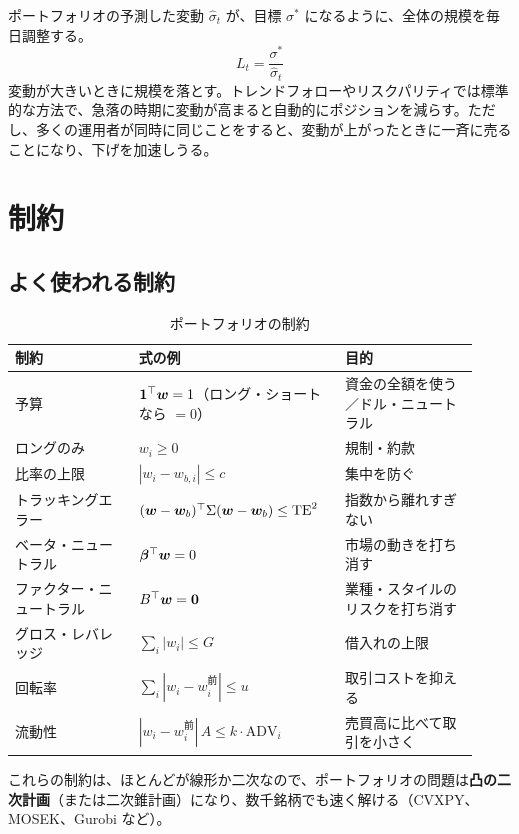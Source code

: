 ポートフォリオの予測した変動 $\hat\sigma_t$ が、目標 $\sigma^*$ になるように、全体の規模を毎日調整する。
\begin{equation}
L_t = \frac{\sigma^*}{\hat\sigma_t}
\end{equation}
変動が大きいときに規模を落とす。トレンドフォローやリスクパリティでは標準的な方法で、急落の時期に変動が高まると自動的にポジションを減らす。ただし、多くの運用者が同時に同じことをすると、変動が上がったときに一斉に売ることになり、下げを加速しうる。

\section{制約}

\subsection{よく使われる制約}

\begin{table}[H]
\centering\small
\caption{ポートフォリオの制約}
\label{tab:constraints}
\begin{tabular}{@{}P{0.25\linewidth}P{0.4\linewidth}P{0.27\linewidth}@{}}
\toprule
制約 & 式の例 & 目的 \\
\midrule
予算 & $\bm 1^{\top}\bm w = 1$（ロング・ショートなら $= 0$） & 資金の全額を使う／ドル・ニュートラル \\
ロングのみ & $w_i \geq 0$ & 規制・約款 \\
比率の上限 & $|w_i - w_{b,i}| \leq c$ & 集中を防ぐ \\
トラッキングエラー & $(\bm w - \bm w_b)^{\top}\Sigma(\bm w - \bm w_b) \leq \mathrm{TE}^2$ & 指数から離れすぎない \\
ベータ・ニュートラル & $\bm\beta^{\top}\bm w = 0$ & 市場の動きを打ち消す \\
ファクター・ニュートラル & $B^{\top}\bm w = \bm 0$ & 業種・スタイルのリスクを打ち消す \\
グロス・レバレッジ & $\sum_i |w_i| \leq G$ & 借入れの上限 \\
回転率 & $\sum_i |w_i - w_{i}^{\text{前}}| \leq u$ & 取引コストを抑える \\
流動性 & $|w_i - w_i^{\text{前}}|\,A \leq k \cdot \mathrm{ADV}_i$ & 売買高に比べて取引を小さく \\
\bottomrule
\end{tabular}
\end{table}

これらの制約は、ほとんどが線形か二次なので、ポートフォリオの問題は\textbf{凸の二次計画}（または二次錐計画）になり、数千銘柄でも速く解ける（CVXPY、MOSEK、Gurobi など）。

